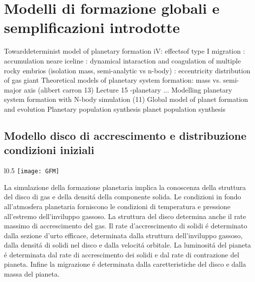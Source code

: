{\let\clearpage\relax\let\cleardoublepage\relax
\chapter{Modelli di formazione globali e semplificazioni introdotte}
}

\begin{workout}
Towarddeterminist model of planetary formation iV: effectsof type I migration
									: accumulation neare iceline
									: dynamical intaraction and coagulation of multiple rocky embrios (isolation mass, semi-analytic vs n-body)
									: eccentricity distribution of gas giant
Theoretical models of planetary system formation: mass vs. semi-major axis	(alibert carron 13)			Lecture 15 -planetary ...
Modelling planetary system formation with N-body simulation (11)
Global model of planet formation and evolution
Planetary population synthesis
planet population synthesis					
\end{workout}

\section{Modello disco di accrescimento e distribuzione condizioni iniziali}

\begin{wrapfigure}[17]{l}{0.5\textwidth}
\texttt{[image: GFM]}\label{fig:GFM}
\caption{Schema dei processi che \'e necessario includere in un modello di formazione planetario coerente.
 Da \cite{benz2014planet}.}
\end{wrapfigure}

La simulazione della formazione planetaria implica la conoscenza della struttura del disco di gas e della densit\'a della componente solida. Le condizioni in fondo all'atmosfera planetaria forniscono le condizioni di temperatura e pressione all'estremo dell'inviluppo gassoso. La struttura del disco determina anche il rate massimo di accrescimento del gas. Il rate d'accrescimento di solidi \'e determinato dalla sezione d'urto efficace, determinata dalla struttura dell'inviluppo gassoso, dalla densit\'a di solidi nel disco e dalla velocit\'a orbitale. La luminosit\'a del pianeta \'e determinata dal rate di accrescimento dei solidi e dal rate di contrazione del pianeta. Infine la migrazione \'e determinata dalla caretteristiche del disco e dalla massa del pianeta.

\clearpage

